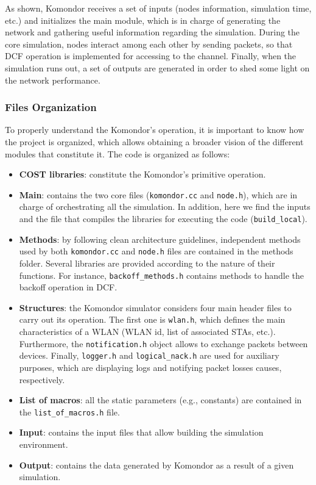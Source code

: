\documentclass[a4paper]{article}
\begin{document}
		As shown, Komondor receives a set of inputs (nodes information, simulation time, etc.) and initializes the main module, which is in charge of generating the network and gathering useful information regarding the simulation. During the core simulation, nodes interact among each other by sending packets, so that DCF operation is implemented for accessing to the channel. Finally, when the simulation runs out, a set of outputs are generated in order to shed some light on the network performance.
		
		\subsubsection{Files Organization}
		\label{section:files}		
		To properly understand the Komondor's operation, it is important to know how the project is organized, which allows obtaining a broader vision of the different modules that constitute it. The code is organized as follows:
		\begin{itemize}
			\item \textbf{COST libraries}: constitute the Komondor's primitive operation. 
			\item \textbf{Main}: contains the two core files (\texttt{komondor.cc} and \texttt{node.h}), which are in charge of orchestrating all the simulation. In addition, here we find the inputs and the file that compiles the libraries for executing the code (\texttt{build\_local}).
			\item \textbf{Methods}: by following clean architecture guidelines, independent methods used by both \texttt{komondor.cc} and \texttt{node.h} files are contained in the methods folder. Several libraries are provided according to the nature of their functions. For instance, \texttt{backoff\_methods.h} contains methods to handle the backoff operation in DCF.
			\item \textbf{Structures}: the Komondor simulator considers four main header files to carry out its operation. The first one is \texttt{wlan.h}, which defines the main characteristics of a WLAN (WLAN id, list of associated STAs, etc.). Furthermore, the \texttt{notification.h} object allows to exchange packets between devices. Finally, \texttt{logger.h} and \texttt{logical\_nack.h} are used for auxiliary purposes, which are displaying logs and notifying packet losses causes, respectively.
			\item \textbf{List of macros}: all the static parameters (e.g., constants) are contained in the \texttt{list\_of\_macros.h} file. 		
			\item \textbf{Input}: contains the input files that allow building the simulation environment.
			\item \textbf{Output}: contains the data generated by Komondor as a result of a given simulation.	
		\end{itemize}
		
\end{document}
